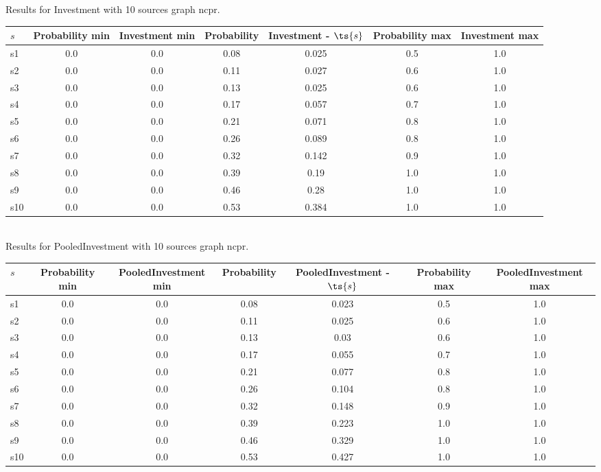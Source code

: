 \documentclass{article}
\begin{document}
\noindent Results for Investment with 10 sources graph ncpr.

\noindent\begin{tabular}{|l|c|c|c|c|c|c|}
\hline
$s$& Probability min & Investment min & Probability & Investment - $\ts{s}$ & Probability max & Investment max\\
\hline
s1 &0.0 & 0.0 & 0.08 & 0.025 & 0.5 & 1.0\\
\hline
s2 &0.0 & 0.0 & 0.11 & 0.027 & 0.6 & 1.0\\
\hline
s3 &0.0 & 0.0 & 0.13 & 0.025 & 0.6 & 1.0\\
\hline
s4 &0.0 & 0.0 & 0.17 & 0.057 & 0.7 & 1.0\\
\hline
s5 &0.0 & 0.0 & 0.21 & 0.071 & 0.8 & 1.0\\
\hline
s6 &0.0 & 0.0 & 0.26 & 0.089 & 0.8 & 1.0\\
\hline
s7 &0.0 & 0.0 & 0.32 & 0.142 & 0.9 & 1.0\\
\hline
s8 &0.0 & 0.0 & 0.39 & 0.19 & 1.0 & 1.0\\
\hline
s9 &0.0 & 0.0 & 0.46 & 0.28 & 1.0 & 1.0\\
\hline
s10 &0.0 & 0.0 & 0.53 & 0.384 & 1.0 & 1.0\\
\hline
\end{tabular}\\

\noindent Results for PooledInvestment with 10 sources graph ncpr.

\noindent\begin{tabular}{|l|c|c|c|c|c|c|}
\hline
$s$& Probability min & PooledInvestment min & Probability & PooledInvestment - $\ts{s}$ & Probability max & PooledInvestment max\\
\hline
s1 &0.0 & 0.0 & 0.08 & 0.023 & 0.5 & 1.0\\
\hline
s2 &0.0 & 0.0 & 0.11 & 0.025 & 0.6 & 1.0\\
\hline
s3 &0.0 & 0.0 & 0.13 & 0.03 & 0.6 & 1.0\\
\hline
s4 &0.0 & 0.0 & 0.17 & 0.055 & 0.7 & 1.0\\
\hline
s5 &0.0 & 0.0 & 0.21 & 0.077 & 0.8 & 1.0\\
\hline
s6 &0.0 & 0.0 & 0.26 & 0.104 & 0.8 & 1.0\\
\hline
s7 &0.0 & 0.0 & 0.32 & 0.148 & 0.9 & 1.0\\
\hline
s8 &0.0 & 0.0 & 0.39 & 0.223 & 1.0 & 1.0\\
\hline
s9 &0.0 & 0.0 & 0.46 & 0.329 & 1.0 & 1.0\\
\hline
s10 &0.0 & 0.0 & 0.53 & 0.427 & 1.0 & 1.0\\
\hline
\end{tabular}\\
\end{document}
